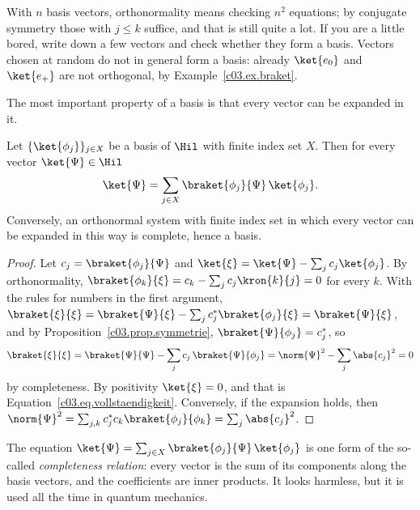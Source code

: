 With $n$ basis vectors, orthonormality means checking $n^2$ equations; by conjugate symmetry
those with $j \leq k$ suffice, and that is still quite a lot. If you are a little bored, write
down a few vectors and check whether they form a basis. Vectors chosen at random do not in
general form a basis: already $\ket{e_0}$ and $\ket{e_+}$ are not orthogonal, by
Example~\ref{c03.ex.braket}.

The most important property of a basis is that every vector can be expanded in it.

\begin{proposition}\label{c03.prop.entwicklung}
  Let $\{\ket{\phi_j}\}_{j \in X}$ be a basis of $\Hil$ with finite index set $X$. Then for
  every vector $\ket{\Psi} \in \Hil$
  \begin{equation}\label{c03.eq.vollstaendigkeit}
    \ket{\Psi} = \sum_{j \in X} \braket{\phi_j}{\Psi}\, \ket{\phi_j} .
  \end{equation}
  Conversely, an orthonormal system with finite index set in which every vector can be expanded
  in this way is complete, hence a basis.
\end{proposition}
\begin{proof}
  Let $c_j = \braket{\phi_j}{\Psi}$ and $\ket{\xi} = \ket{\Psi} - \sum_j c_j \ket{\phi_j}$. By
  orthonormality, $\braket{\phi_k}{\xi} = c_k - \sum_j c_j \kron{k}{j} = 0$ for every $k$. With
  the rules for numbers in the first argument,
  $\braket{\xi}{\xi} = \braket{\Psi}{\xi} - \sum_j c_j^* \braket{\phi_j}{\xi} = \braket{\Psi}{\xi}$,
  and by Proposition~\ref{c03.prop.symmetrie}, $\braket{\Psi}{\phi_j} = c_j^*$, so
  \begin{equation}\label{c03.eq.entwicklung-beweis}
    \braket{\xi}{\xi} = \braket{\Psi}{\Psi} - \sum_{j} c_j\, \braket{\Psi}{\phi_j}
    = \norm{\Psi}^2 - \sum_{j} \abs{c_j}^2 = 0
  \end{equation}
  by completeness. By positivity $\ket{\xi} = 0$, and that is
  Equation~\eqref{c03.eq.vollstaendigkeit}. Conversely, if the expansion holds, then
  $\norm{\Psi}^2 = \sum_{j,k} c_j^* c_k \braket{\phi_j}{\phi_k} = \sum_j \abs{c_j}^2$.
\end{proof}

\begin{merksatz}
  The equation
  $\ket{\Psi} = \sum_{j \in X} \braket{\phi_j}{\Psi}\, \ket{\phi_j}$ is one form of the
  so-called \emph{completeness relation}: every vector is the sum of its components along the
  basis vectors, and the coefficients are inner products. It looks harmless, but it is used all
  the time in quantum mechanics.
\end{merksatz}

